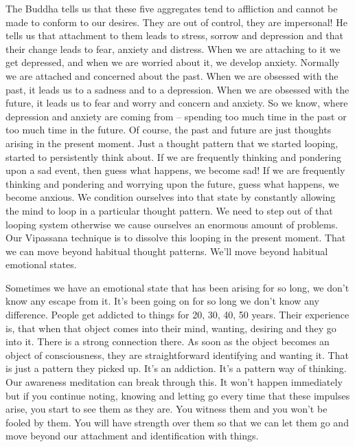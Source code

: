 \documentclass[letterpaper,10pt,english]{sphinxmanual}
\begin{document}
\sphinxAtStartPar
The  Buddha  tells  us  that  these  five  aggregates  tend  to  affliction  and
cannot be made to conform to our desires. They are out of control, they are
impersonal! He tells us that attachment to them leads to stress, sorrow and
depression  and  that  their  change  leads  to  fear,  anxiety  and  distress. When
we are attaching to it we get depressed, and when we are worried about it,
we develop anxiety. Normally we are attached and concerned about the past.
When we are obsessed with the past, it leads us to a sadness and to a depression. When  we  are  obsessed  with  the  future,  it  leads  us  to  fear  and  worry
and  concern  and  anxiety.  So  we  know,  where  depression  and  anxiety  are
coming from – spending too much time in the past or too much time in the
future. Of course, the past and future are just thoughts arising in the present
moment. Just a thought pattern that we started looping, started to persistently
think about.
If we are frequently thinking and
pondering upon a sad event, then guess what happens, we become sad! If we
are frequently thinking and pondering and worrying upon the future, guess
what happens, we become anxious. We condition ourselves into that state by
constantly allowing the mind to loop in a particular thought pattern. We need
to step out of that looping system otherwise we cause ourselves an enormous
amount of problems. Our Vipassana technique is to dissolve this looping in
the  present  moment. That  we  can  move  beyond  habitual  thought  patterns.
We’ll move beyond habitual emotional states.

\sphinxAtStartPar
Sometimes  we  have  an  emotional  state  that  has  been  arising  for  so
long, we don’t know any escape from it. It’s been going on for so long we
don’t  know  any  difference.  People  get  addicted  to  things  for  20,  30,  40,
  50 years. Their experience is, that when that object comes into their mind,
wanting, desiring and they go into it. There is a strong connection there. As
soon as the object becomes an object of consciousness, they are straightforward identifying and wanting it. That is just a pattern they picked up. It’s
an addiction. It’s a pattern way of thinking. Our awareness meditation can
break through this. It won’t happen immediately but if you continue noting,
knowing and letting go every time that these impulses arise, you start to see
them as they are. You witness them and you won’t be fooled by them. You
will have strength over them so that we can let them go and move beyond
our attachment and identification with things.
\end{document}
